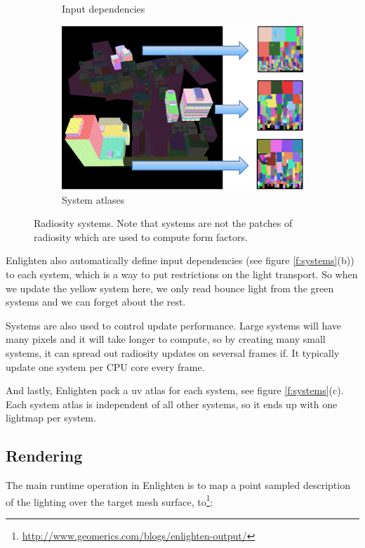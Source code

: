 \begin{figure}
\begin{subfigure}[b]{0.285\textwidth}
		\caption{Input dependencies}
	\end{subfigure}
	\begin{subfigure}[b]{0.42\textwidth}
		\includegraphics[width=1.0\textwidth]{graphics/gi/path-30-3}
		\caption{System atlases}
	\end{subfigure}
	\caption{Radiosity systems. Note that systems are not the patches of radiosity which are used to compute form factors.}
\end{figure}

Enlighten also automatically define input dependencies (see figure \ref{f:systems}(b)) to each system, which is a way to put restrictions on the light transport. So when we update the yellow system here, we only read bounce light from the green systems and we can forget about the rest.

Systems are also used to control update performance. Large systems will have many pixels and it will take longer to compute, so by creating many small systems, it can spread out radiosity updates on seversal frames if. It typically update one system per CPU core every frame.

And lastly, Enlighten pack a uv atlas for each system, see figure \ref{f:systems}(c). Each system atlas is independent of all other systems, so it ends up with one lightmap per system.



\subsection{Rendering}
The main runtime operation in Enlighten is to map a point sampled description of the lighting over the target mesh surface, to\footnote{\url{http://www.geomerics.com/blogs/enlighten-output/}}:

